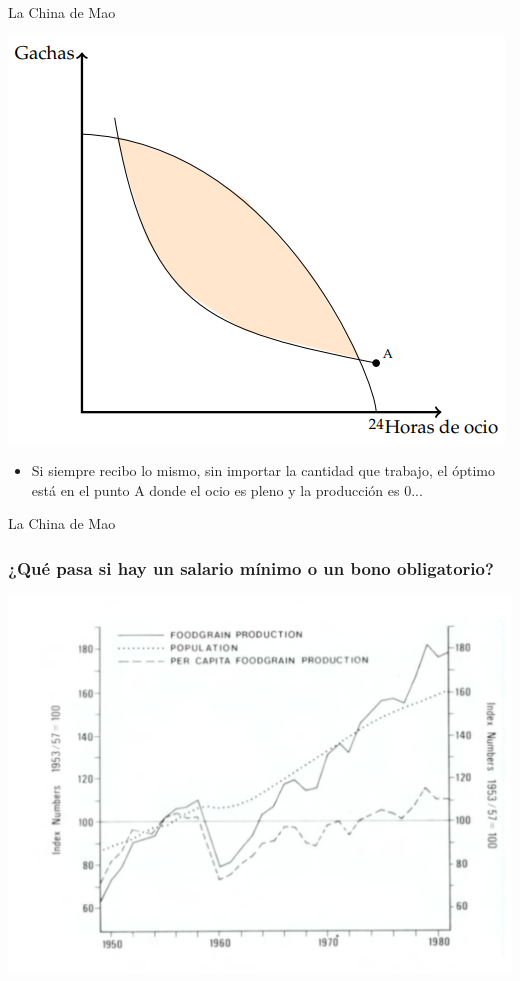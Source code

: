 \documentclass{beamer}
\begin{document}
\begin{frame}{La China de Mao}
    \begin{center}
        \includegraphics[scale=0.6]{../Figures/C19.15.png}
    \end{center}
    \begin{itemize}
        \item Si siempre recibo lo mismo, sin importar la cantidad que trabajo, el óptimo está en el punto A donde el ocio es pleno y la producción es 0... 
    \end{itemize}
\end{frame}

\begin{frame}{La China de Mao }
    \frametitle{¿Qué pasa si hay un salario mínimo o un bono obligatorio?}
    \centering
    \includegraphics[scale=0.45]{../Figures/C19.18.png}
\end{frame}
\end{document}
